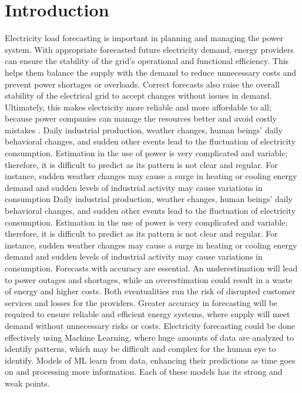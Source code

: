 \documentclass[12pt, a4paper,twoside]{report}
\theoremstyle{plain} %
\theoremstyle{definition} %
\theoremstyle{remark} %
\numberwithin{equation}{chapter}
\begin{document}
\chapter{Introduction}\label{ch:1}
Electricity load forecasting is important in planning and managing the power system. With appropriate forecasted future electricity demand, energy providers can ensure the stability of the grid's operational and functional efficiency. This helps them balance the supply with the demand to reduce unnecessary costs and prevent power shortages or overloads. Correct forecasts also raise the overall stability of the electrical grid to accept changes without issues in demand. Ultimately, this makes electricity more reliable and more affordable to all; because power companies can manage the resources better and avoid costly mistakes \cite{hong2016probabilistic}.
\newline
\newline
Daily industrial production, weather changes, human beings' daily behavioral changes, and sudden other events lead to the fluctuation of electricity consumption. Estimation in the use of power is very complicated and variable; therefore, it is difficult to predict as its pattern is not clear and regular. For instance, sudden weather changes may cause a surge in heating or cooling energy demand and sudden levels of industrial activity may cause variations in consumption\cite{zhang1998forecasting}
Daily industrial production, weather changes, human beings' daily behavioral changes, and sudden other events lead to the fluctuation of electricity consumption. Estimation in the use of power is very complicated and variable; therefore, it is difficult to predict as its pattern is not clear and regular. For instance, sudden weather changes may cause a surge in heating or cooling energy demand and sudden levels of industrial activity may cause variations in consumption.
Forecasts with accuracy are essential. An underestimation will lead to power outages and shortages, while an overestimation could result in a waste of energy and higher costs. Both eventualities run the risk of disrupted customer services and losses for the providers. Greater accuracy in forecasting will be required to ensure reliable and efficient energy systems, where supply will meet demand without unnecessary risks or costs\cite{zhang1998forecasting}.
\newline
\newline
Electricity forecasting could be done effectively using Machine Learning, where huge amounts of data are analyzed to identify patterns, which may be difficult and complex for the human eye to identify. Models of ML learn from data, enhancing their predictions as time goes on and processing more information. Each of these models has its strong and weak points.
\end{document}
